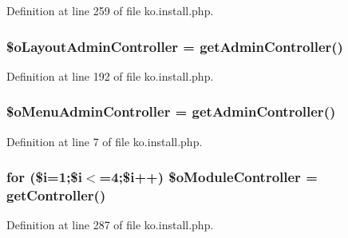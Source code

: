 Definition at line 259 of file ko.\+install.\+php.

\hypertarget{ko_8install_8php_a6a03496003da7df71cf94d9accb430be}{}
\subsubsection[{\$o\+Layout\+Admin\+Controller}]{\setlength{\rightskip}{0pt plus 5cm}\$o\+Layout\+Admin\+Controller = {\bf get\+Admin\+Controller}(\textquotesingle{})}\label{ko_8install_8php_a6a03496003da7df71cf94d9accb430be}


Definition at line 192 of file ko.\+install.\+php.

\hypertarget{ko_8install_8php_a9062530c3b03479ca4530daee1c18887}{}
\subsubsection[{\$o\+Menu\+Admin\+Controller}]{\setlength{\rightskip}{0pt plus 5cm}\$o\+Menu\+Admin\+Controller = {\bf get\+Admin\+Controller}(\textquotesingle{})}\label{ko_8install_8php_a9062530c3b03479ca4530daee1c18887}


Definition at line 7 of file ko.\+install.\+php.

\hypertarget{ko_8install_8php_a9fd93f6625cec4fd65bf6f412e28c015}{}
\subsubsection[{\$o\+Module\+Controller}]{\setlength{\rightskip}{0pt plus 5cm}for (\$i=1;\$i$<$=4;\$i++) \$o\+Module\+Controller = {\bf get\+Controller}(\textquotesingle{})}\label{ko_8install_8php_a9fd93f6625cec4fd65bf6f412e28c015}


Definition at line 287 of file ko.\+install.\+php.

\hypertarget{ko_8install_8php_a8d7a87df524e7d6938f66f8e284cdd1e}{}
